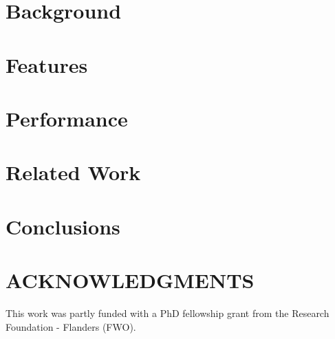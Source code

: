 \documentclass{scs}
\begin{document}
\section{Background}


\section{Features}


\section{Performance}


\section{Related Work}


\section{Conclusions}


\section*{ACKNOWLEDGMENTS}
This work was partly funded with a PhD fellowship grant from the Research Foundation - Flanders (FWO).



\end{document}
